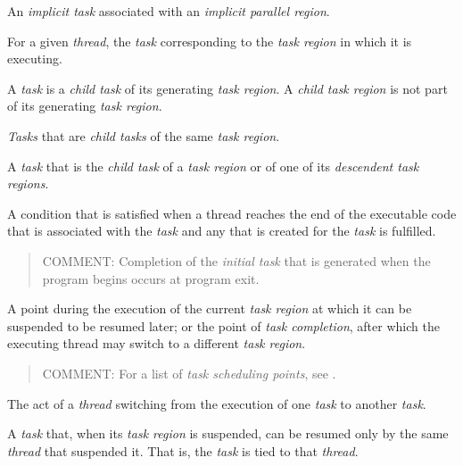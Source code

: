\glossarydefstart
An \emph{implicit task} associated with an \emph{implicit parallel region}.
\glossarydefend

\glossarydefstart
For a given \emph{thread}, the \emph{task} corresponding to the 
\emph{task region} in which it is executing.
\glossarydefend

\glossarydefstart
A \emph{task} is a \emph{child task} of its generating \emph{task region}.
A \emph{child task region} is not part of its generating \emph{task region}.
\glossarydefend

\glossarydefstart
\emph{Tasks} that are \emph{child tasks} of the same \emph{task region}.
\glossarydefend

\glossarydefstart
A \emph{task} that is the \emph{child task} of a \emph{task region} or 
of one of its \emph{descendent task regions}.
\glossarydefend

\glossarydefstart
A condition that is satisfied when a thread reaches the end of the executable
code that is associated with the \emph{task} and any
 that is created for the \emph{task} is fulfilled.

\begin{quote}
COMMENT: Completion of the \emph{initial task} that is generated when the 
program begins occurs at program exit.
\end{quote}
\glossarydefend

\glossarydefstart
A point during the execution of the current \emph{task region} at which it 
can be suspended to be resumed later; or the point of \emph{task completion}, 
after which the executing thread may switch to a different \emph{task region}.

\begin{quote}
COMMENT: For a list of \emph{task scheduling points}, see 
.
\end{quote}
\glossarydefend

\glossarydefstart
The act of a \emph{thread} switching from the execution of one \emph{task} 
to another \emph{task}.
\glossarydefend

\glossarydefstart
A \emph{task} that, when its \emph{task region} is suspended, can be resumed 
only by the same \emph{thread} that suspended it. That is, the \emph{task} 
is tied to that \emph{thread}.
\glossarydefend

